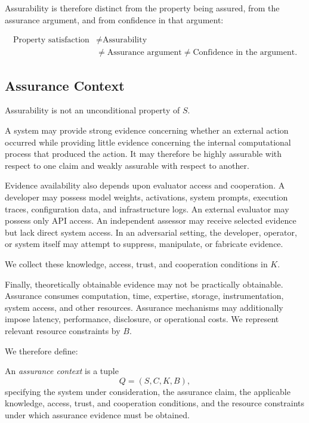 Assurability is therefore distinct from the property being assured,
from the assurance argument, and from confidence in that argument:

\begin{equation}
  \boxed{
    \begin{aligned}
      \text{Property satisfaction}
       & \neq
      \text{Assurability} \\
       & \neq
      \text{Assurance argument}
      \neq
      \text{Confidence in the argument}.
    \end{aligned}
  }
  \label{eq:assurance-distinctions}
\end{equation}

\subsection{Assurance Context}
\label{aa.subsec.assurance-context}

Assurability is not an unconditional property of \(S\).

A system may provide strong evidence concerning whether an external
action occurred while providing little evidence concerning the internal
computational process that produced the action.
It may therefore be highly assurable with respect to one claim and
weakly assurable with respect to another.

Evidence availability also depends upon evaluator access and cooperation.
A developer may possess model weights, activations, system prompts,
execution traces, configuration data, and infrastructure logs.
An external evaluator may possess only API access.
An independent assessor may receive selected evidence but lack direct
system access.
In an adversarial setting, the developer, operator, or system itself
may attempt to suppress, manipulate, or fabricate evidence.

We collect these knowledge, access, trust, and cooperation conditions
in \(K\).

Finally, theoretically obtainable evidence may not be practically
obtainable.
Assurance consumes computation, time, expertise, storage, instrumentation,
system access, and other resources.
Assurance mechanisms may additionally impose latency, performance,
disclosure, or operational costs.
We represent relevant resource constraints by \(B\).

We therefore define:

\begin{definition}
  \label{se320.def.AssuranceContext}
  An \emph{assurance context} is a tuple
  \begin{equation}
    Q=(S,C,K,B),
  \end{equation}
  specifying the system under consideration, the assurance claim,
  the applicable knowledge, access, trust, and cooperation conditions,
  and the resource constraints under which assurance evidence
  must be obtained.
\end{definition}


